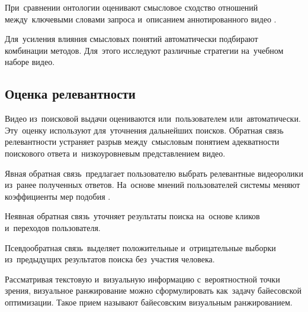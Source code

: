 При~сравнении онтологии оценивают смысловое сходство
отношений между~ключевыми словами запроса
и~описанием аннотированного видео \cite{Aytar:2008}.

Для~усиления влияния смысловых понятий
автоматически подбирают комбинации методов.
Для~этого исследуют различные стратегии на~учебном наборе видео.

\subsection{Оценка релевантности}

Видео из~поисковой выдачи оцениваются или~пользователем или~автоматически.
Эту~оценку используют для~уточнения дальнейших поисков.
Обратная связь релевантности устраняет разрыв между~смысловым понятием
адекватности поискового ответа и~низкоуровневым представлением видео.

Явная обратная связь\ предлагает пользователю выбрать
релевантные видеоролики из~ранее полученных ответов.
На~основе мнений пользователей системы меняют коэффициенты
мер подобия \cite{Chen:2008:a}.

Неявная обратная связь\ уточняет результаты поиска
на~основе кликов и~переходов пользователя.

Псевдообратная связь\
выделяет положительные и~отрицательные выборки
из~предыдущих результатов поиска без~участия человека.

Рассматривая текстовую и~визуальную информацию
с~вероятностной точки зрения, визуальное ранжирование
можно сформулировать как~задачу байесовской оптимизации.
Такое прием называют байесовским визуальным ранжированием.













